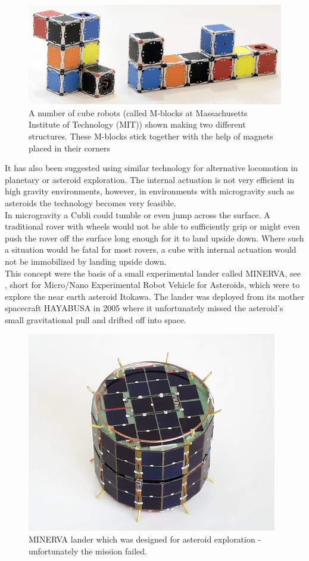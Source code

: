 \begin{figure}[H] 
	\centering
	\includegraphics[scale=0.4]{figures/m-blocks}
	\caption{A number of cube robots (called M-blocks at Massachusetts Institute of Technology (MIT)) shown making two different structures. These M-blocks stick together with the help of magnets placed in their corners\cite{LRosen}}
	\label{MBlocksExample}
\end{figure}
%
It has also been suggested using similar technology for alternative locomotion in planetary or asteroid exploration. The internal actuation is not very efficient in high gravity environments, however, in environments with microgravity such as asteroids the technology becomes very feasible.\cite{RAllen}\\
In microgravity a Cubli could tumble or even jump across the surface. A traditional rover with wheels would not be able to sufficiently grip or might even push the rover off the surface long enough for it to land upside down. Where such a situation would be fatal for most rovers, a cube with internal actuation would not be immobilized by landing upside down.\cite{ELandau}\\
This concept were the basis of a small experimental lander called MINERVA, see , short for Micro/Nano Experimental Robot Vehicle for Asteroids, which were to explore the near earth asteroid Itokawa. The lander was deployed from its mother spacecraft HAYABUSA in 2005 where it unfortunately missed the asteroid's small gravitational pull and drifted off into space.\cite{TYoshimitsu}
%
\begin{figure}[H] 
	\centering
	\includegraphics[scale=.8]{figures/MINERVA}
	\caption{MINERVA lander which was designed for asteroid exploration - unfortunately the mission failed\cite{TYoshimitsu}.}
	\label{MINERVA}
\end{figure}

